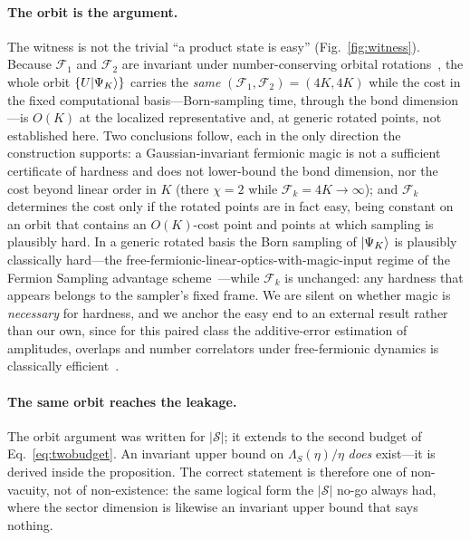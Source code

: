 \paragraph{The orbit is the argument.} The witness is not the trivial ``a product state is easy''
(Fig.~\ref{fig:witness}). Because $\mathcal F_1$ and $\mathcal F_2$ are invariant under number-conserving
orbital rotations~\cite{sierant2026}, the whole orbit $\{U\lvert \Psi_K \rangle\}$ carries the \emph{same}
$(\mathcal F_1,\mathcal F_2)=(4K,4K)$ while the cost in the fixed computational basis---Born-sampling
time, through the bond dimension---is $O(K)$ at the localized representative and, at generic rotated
points, not established here. Two conclusions
follow, each in the only direction the construction supports: a Gaussian-invariant fermionic magic is not
a sufficient certificate of hardness and does not lower-bound the bond dimension, nor the cost beyond linear order in $K$ (there $\chi=2$ while
$\mathcal F_k=4K\to\infty$); and $\mathcal F_k$ determines the cost only if the rotated points are in
fact easy, being constant on an orbit that contains an $O(K)$-cost point and points at which sampling is
plausibly hard. In a generic rotated basis the Born sampling of $\lvert \Psi_K \rangle$
is plausibly classically hard---the free-fermionic-linear-optics-with-magic-input regime of the Fermion
Sampling advantage scheme~\cite{fermionsampling2022}---while $\mathcal F_k$ is unchanged: any hardness
that appears belongs to the sampler's fixed frame. We are silent on whether magic is \emph{necessary} for
hardness, and we anchor the easy end to an external result rather than our own, since for this paired
class the additive-error estimation of amplitudes, overlaps and number correlators under free-fermionic
dynamics is classically efficient~\cite{oh2026}.

\paragraph{The same orbit reaches the leakage.} The orbit argument was written for $|\mathcal S|$; it
extends to the second budget of Eq.~\eqref{eq:twobudget}. An invariant upper
%
%
bound on $\Lambda_S(\eta)/\eta$ \emph{does} exist---it is derived inside the proposition. The correct statement is
therefore one of non-vacuity, not of non-existence: the same logical form the $|\mathcal S|$ no-go always
had, where the sector dimension is likewise an invariant upper bound that says nothing.

%
%




